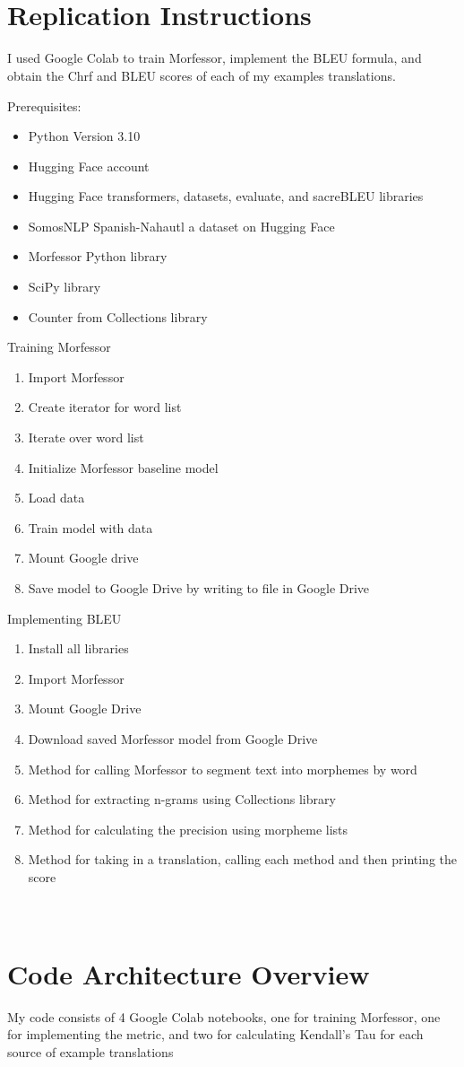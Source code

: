 \documentclass[10pt,twocolumn]{article}
\begin{document}
\appendix
\section{\\Replication Instructions}
I used Google Colab to train Morfessor, implement the BLEU formula, and obtain the Chrf and BLEU scores of each of my examples translations.

Prerequisites:
\begin{itemize}
    \item Python Version 3.10
    \item Hugging Face account
    \item Hugging Face transformers, datasets, evaluate, and sacreBLEU libraries
    \item SomosNLP Spanish-Nahautl a dataset on Hugging Face
    \item Morfessor Python library
    \item SciPy library
    \item Counter from Collections library

    \end{itemize} 

Training Morfessor
\begin{enumerate}
    \item Import Morfessor
    \item Create iterator for word list
    \item Iterate over word list
    \item Initialize Morfessor baseline model
    \item Load data
    \item Train model with data
    \item Mount Google drive
    \item Save model to Google Drive by writing to file in Google Drive
\end{enumerate}


Implementing BLEU
\begin{enumerate}
    \item Install all libraries
    \item Import Morfessor 
    \item Mount Google Drive
    \item Download saved Morfessor model from Google Drive
    \item Method for calling Morfessor to segment text into morphemes by word
    \item Method for extracting n-grams using Collections library
    \item Method for calculating the precision using morpheme lists
    \item Method for taking in a translation, calling each method and then printing the score
\end{enumerate}


\section{\\Code Architecture Overview}
My code consists of 4 Google Colab notebooks,  one for training Morfessor, one for implementing the metric, and two for calculating Kendall's Tau for each source of example translations

\printbibliography
\end{document}
